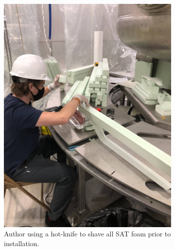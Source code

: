 \begin{figure}[!htbp]
  \begin{subfigure}{.5\textwidth}
  \centering
  \includegraphics[width=\linewidth]{Figures/Construction/foam_shaving.jpg}
  \caption{Author using a hot-knife to shave all SAT foam prior to installation.}
  \label{fig:foam_saving}
  \end{subfigure}
  \begin{subfigure}{.5\textwidth}
  \centering

\end{subfigure}
\end{figure}
